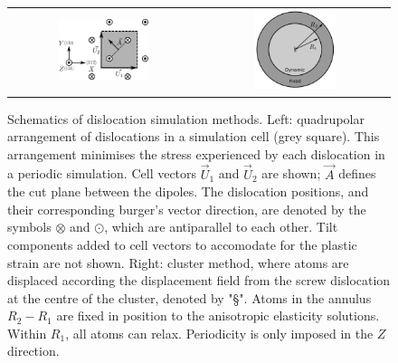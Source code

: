 \documentclass[a4paper,11pt]{article}
\numberwithin{equation}{chapter}
\numberwithin{listing}{chapter}
\begin{document}
        \begin{figure}
    \begin{tabular}{cc}
	     \includegraphics[width=0.5\textwidth]{Images/s_arrangement_quadrupole.png} &
             \includegraphics[width=0.45\textwidth]{Images/cluster_method_schematic.png}  \\
    \end{tabular}
\caption{Schematics of dislocation simulation methods. Left: quadrupolar arrangement of dislocations in a simulation cell (grey square). This arrangement  minimises the stress experienced by each dislocation in a periodic simulation. Cell vectors $\vec{U}_1$ and $\vec{U}_2$ are shown; $\vec{A}$ defines the cut plane between the dipoles. The dislocation positions, and their corresponding burger's vector direction, are denoted by the symbols $\otimes$ and $\odot$, which are antiparallel to each other. Tilt components added to cell vectors to accomodate for the plastic strain are not shown. Right: cluster method, where atoms are displaced according the displacement field from the screw dislocation at the centre of the cluster, denoted by "\S". Atoms in the annulus $R_2 - R_1$ are fixed in position to the anisotropic elasticity solutions. Within $R_1$, all atoms can relax. Periodicity is only imposed in the $Z$ direction.}
	\label{fig:dislocationschematics}
    \end{figure}
\end{document}
